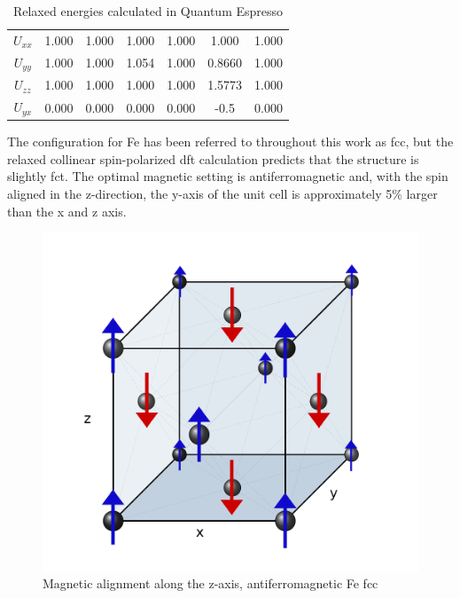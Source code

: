 \begin{landscape}
\begin{table}[h]
\begin{center}
\begin{tabular}{c c c c c c c}
$U_{xx}$                   & 1.000           & 1.000            & 1.000              & 1.000              & 1.000            & 1.000           \\
$U_{yy}$                   & 1.000           & 1.000            & 1.054              & 1.000               & 0.8660            & 1.000          \\
$U_{zz}$                   & 1.000           & 1.000            & 1.000              & 1.000                & 1.5773            & 1.000         \\
$U_{yx}$                   & 0.000           & 0.000            & 0.000              & 0.000                & -0.5            & 0.000         \\
\hline\hline
\end{tabular}
\end{center}
\caption{Relaxed energies calculated in Quantum Espresso}
\label{table:relaxedenergies}
\end{table}

\end{landscape}
\clearpage


The configuration for Fe has been referred to throughout this work as \acrshort{fcc}, but the relaxed collinear spin-polarized \acrshort{dft} calculation predicts that the structure is slightly \acrfull{fct}.  The optimal magnetic setting is antiferromagnetic and, with the spin aligned in the z-direction, the y-axis of the unit cell is approximately 5\% larger than the x and z axis.

\begin{figure}[ht] 
  \centering
  \includegraphics[width=.7\linewidth]{chapters/potentials_fe_pd_ru/images/fe-austenitic-mag.png} 
  \caption{Magnetic alignment along the z-axis, antiferromagnetic Fe fcc}  
  \label{fig:ironfccantiferromagnetic}
\end{figure}

